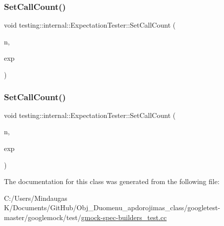 \mbox{\label{classtesting_1_1internal_1_1_expectation_tester_af5d762355ef83f414c4b0fc14c8fc943}} 
\subsubsection{\texorpdfstring{SetCallCount()}{SetCallCount()}\hspace{0.1cm}{\footnotesize\ttfamily [2/3]}}
{\footnotesize\ttfamily void testing\+::internal\+::\+Expectation\+Tester\+::\+Set\+Call\+Count (\begin{DoxyParamCaption}\item[{int}]{n,  }\item[{Expectation\+Base $\ast$}]{exp }\end{DoxyParamCaption})\hspace{0.3cm}{\ttfamily [inline]}}

\mbox{\label{classtesting_1_1internal_1_1_expectation_tester_af5d762355ef83f414c4b0fc14c8fc943}} 
\subsubsection{\texorpdfstring{SetCallCount()}{SetCallCount()}\hspace{0.1cm}{\footnotesize\ttfamily [3/3]}}
{\footnotesize\ttfamily void testing\+::internal\+::\+Expectation\+Tester\+::\+Set\+Call\+Count (\begin{DoxyParamCaption}\item[{int}]{n,  }\item[{Expectation\+Base $\ast$}]{exp }\end{DoxyParamCaption})\hspace{0.3cm}{\ttfamily [inline]}}



The documentation for this class was generated from the following file\+:\begin{DoxyCompactItemize}
\item 
C\+:/\+Users/\+Mindaugas K/\+Documents/\+Git\+Hub/\+Obj\+\_\+\+Duomenu\+\_\+apdorojimas\+\_\+class/googletest-\/master/googlemock/test/\mbox{\hyperlink{googletest-master_2googlemock_2test_2gmock-spec-builders__test_8cc}{gmock-\/spec-\/builders\+\_\+test.\+cc}}\end{DoxyCompactItemize}
